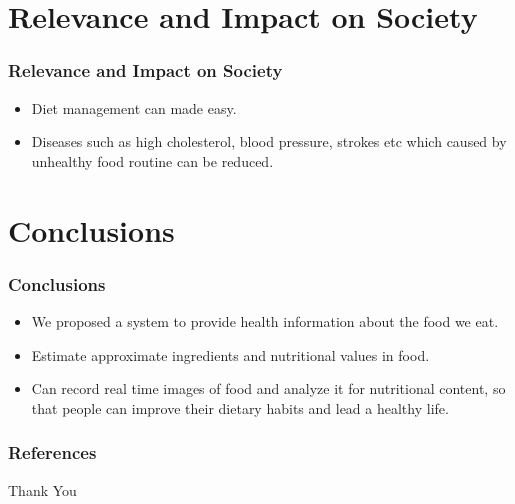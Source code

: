 \documentclass{beamer}
\begin{document}
\section{Relevance and Impact on Society}
\begin{frame}
\frametitle{Relevance and Impact on Society}
\begin{itemize}
    \item Diet management can made easy.
    \item Diseases such as high cholesterol, blood pressure, strokes etc which caused by unhealthy food routine can be reduced.
\end{itemize}
\end{frame}


\section{Conclusions}
\begin{frame}
\frametitle{Conclusions}
\begin{itemize}
    \item We proposed a system to provide health information about the food we eat.
    \item Estimate approximate ingredients and nutritional values in food.
    \item Can record real time images of food and analyze it for nutritional content, so that people can improve their dietary habits and lead a healthy life.
\end{itemize}
\end{frame}


\begin{frame}[allowframebreaks] %

\frametitle{References}

\scriptsize{}

\nocite{*}
\end{frame}

\begin{frame}
\Huge{\centerline{Thank You}}
\end{frame}
\end{document}
